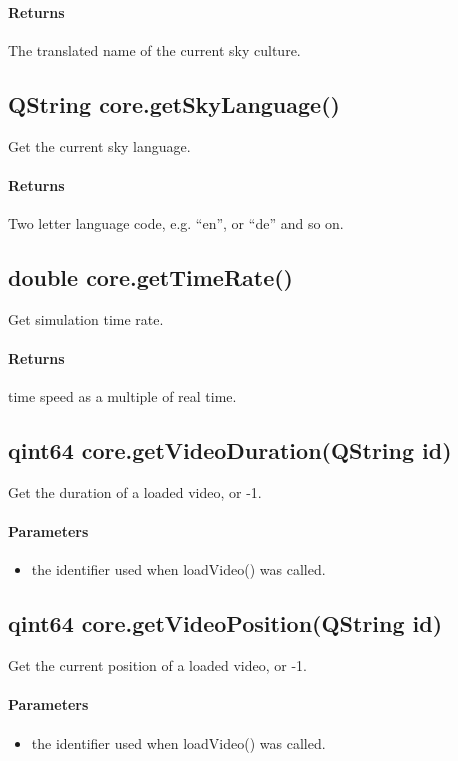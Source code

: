 \paragraph{Returns}
The translated name of the current sky culture.

\subsection{QString core.getSkyLanguage()}
\label{sec:ScriptingAPI:core:getSkyLanguage}
Get the current sky language.

\paragraph{Returns}
Two letter language code, e.g. ``en'', or ``de'' and so on.

\subsection{double core.getTimeRate()}
\label{sec:ScriptingAPI:core:getTimeRate}
Get simulation time rate.

\paragraph{Returns}
time speed as a multiple of real time.

\subsection{qint64 core.getVideoDuration(QString id)}
\label{sec:ScriptingAPI:core:getVideoDuration}
Get the duration of a loaded video, or -1.

\paragraph{Parameters}
\begin{itemize}
\item {} the identifier used when loadVideo() was called.
\end{itemize}

\subsection{qint64 core.getVideoPosition(QString id)}
\label{sec:ScriptingAPI:core:getVideoPosition}
Get the current position of a loaded video, or -1.

\paragraph{Parameters}
\begin{itemize}
\item {} the identifier used when loadVideo() was called.
\end{itemize}

